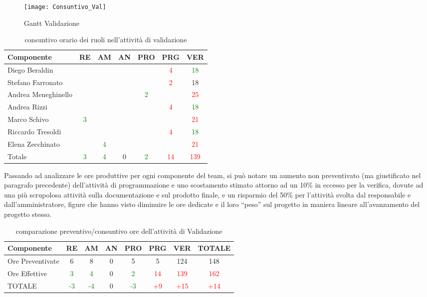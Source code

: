 \begin{figure}[h]
 \texttt{[image: Consuntivo\_Val]}
\caption{Gantt Validazione}\label{fig:ganttvalidazione}
\end{figure}

\begin{table}[h!]
\centering
\begin{tabular}{|l|c|c|c|c|c|c|}
\hline
Componente& RE& AM& AN& PRO& PRG& VER\\
\hline
Diego Beraldin & & & & & \textcolor{red}{4}& \textcolor{green}{18}\\
Stefano Farronato & & & & & \textcolor{red}{2}& 18\\
Andrea Meneghinello & & & & \textcolor{green}{2}& &\textcolor{red}{ 25}\\
Andrea Rizzi & & & & & \textcolor{red}{4}& \textcolor{green}{18}\\
Marco Schivo & \textcolor{green}{3}& & & & &\textcolor{red}{21}\\
Riccardo Tresoldi & & & & & \textcolor{red}{4}& \textcolor{green}{18}\\
Elena Zecchinato & & \textcolor{green}{4}& & & & \textcolor{red}{21}\\
\hline
Totale & \textcolor{green}{3}& \textcolor{green}{4}& 0& \textcolor{green}{2}& \textcolor{red}{14}& \textcolor{red}{139}\\
\hline
\end{tabular}
\caption{consuntivo orario dei ruoli nell'attività di validazione}\label{tab:consruolipdc}
\end{table}


Passando ad analizzare le ore produttive per ogni componente del team, si può notare un aumento non preventivato (ma giustificato nel paragrafo precedente) dell'attività di programmazione e uno scostamento stimato attorno ad un 10\% in eccesso per la verifica, dovute ad una più scrupolosa attività sulla documentazione e sul prodotto finale, e un risparmio del 50\% per l'attività svolta dal responsabile e dall'amministratore, figure che hanno visto diminuire le ore dedicate e il loro ``peso'' sul progetto in maniera lineare all'avanzamento del progetto stesso.

\begin{table}[H]
\centering
\begin{tabular}{|l|c c c c c c|c|}
\hline
Componente		& RE&   AM&   AN&  PRO& PRG& VER & TOTALE\\
\hline
Ore Preventivate	& 6&    8&   0&  5& 5&    124  & 148\\
Ore Effettive       	& \textcolor{green}{3} &   \textcolor{green}{4} &   0&  \textcolor{green}{2}& \textcolor{red}{14}&     \textcolor{red}{139} & \textcolor{red}{162}\\
\hline
TOTALE			& \textcolor{green}{-3}&    \textcolor{green}{-4}&    0&    \textcolor{green}{-3}&\textcolor{red}{+9}& \textcolor{red}{+15}& \textcolor{red}{+14}\\
\hline
\end{tabular}
\caption{comparazione preventivo/consuntivo ore dell'attività di Validazione}\label{tab:consoreval}
\end{table}


